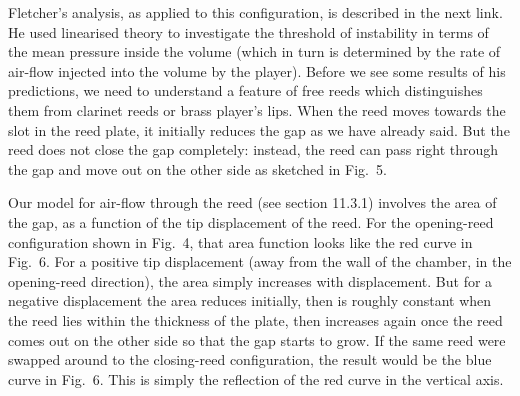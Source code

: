 
  Fletcher’s analysis, as applied to this configuration, is described in the 
  next link. He used linearised theory to investigate the threshold of 
  instability in terms of the mean pressure inside the volume (which in turn is 
  determined by the rate of air-flow injected into the volume by the player). 
  Before we see some results of his predictions, we need to understand a 
  feature of free reeds which distinguishes them from clarinet reeds or brass 
  player’s lips. When the reed moves towards the slot in the reed plate, it 
  initially reduces the gap as we have already said. But the reed does not 
  close the gap completely: instead, the reed can pass right through the gap 
  and move out on the other side as sketched in Fig.\ 5. 


  Our model for air-flow through the reed (see section 11.3.1) involves the 
  area of the gap, as a function of the tip displacement of the reed. For the 
  opening-reed configuration shown in Fig.\ 4, that area function looks like 
  the red curve in Fig.\ 6. For a positive tip displacement (away from the wall 
  of the chamber, in the opening-reed direction), the area simply increases 
  with displacement. But for a negative displacement the area reduces 
  initially, then is roughly constant when the reed lies within the thickness 
  of the plate, then increases again once the reed comes out on the other side 
  so that the gap starts to grow. If the same reed were swapped around to the 
  closing-reed configuration, the result would be the blue curve in Fig.\ 6. 
  This is simply the reflection of the red curve in the vertical axis. 


